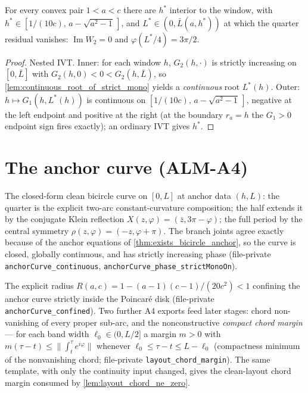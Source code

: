 \begin{theorem}
  \label{thm:exists_bicircle_anchor}
  For every convex pair $1<a<c$ there are $h^*$ interior to the window, with
  $h^*\in[1/(10c),\,a-\sqrt{a^2-1}\,]$, and $L^*\in(0,\bar L(a,h^*))$ at
  which the quarter residual vanishes:
  $\operatorname{Im}W_2=0$ and $\varphi(L^*/4)=3\pi/2$.
\end{theorem}

\begin{proof}
  \leanok
  Nested IVT.  Inner: for each window $h$, $G_2(h,\cdot)$ is strictly
  increasing on $[0,\bar L]$ with $G_2(h,0)<0<G_2(h,\bar L)$, so
  \cref{lem:continuous_root_of_strict_mono} yields a \emph{continuous} root
  $L^*(h)$.  Outer: $h\mapsto G_1(h,L^*(h))$ is continuous on
  $[1/(10c),\,a-\sqrt{a^2-1}\,]$, negative at the left endpoint and positive
  at the right (at the boundary $r_a=h$ the $G_1>0$ endpoint sign fires
  exactly); an ordinary IVT gives $h^*$.
\end{proof}

\section{The anchor curve (ALM-A4)}

\begin{definition}
  \label{def:anchor_curve}
  The closed-form clean bicircle curve on $[0,L]$ at anchor data $(h,L)$: the
  quarter is the explicit two-arc constant-curvature composition; the half
  extends it by the conjugate Klein reflection
  $X(z,\varphi)=(\bar z,3\pi-\varphi)$; the full period by the central
  symmetry $\rho(z,\varphi)=(-z,\varphi+\pi)$.  The branch joints agree
  exactly because of the anchor equations of
  \cref{thm:exists_bicircle_anchor}, so the curve is closed, globally
  continuous, and has strictly increasing phase (file-private
  \texttt{anchorCurve\_continuous}, \texttt{anchorCurve\_phase\_strictMonoOn}).
\end{definition}

\begin{definition}
  \label{def:anchor_confine_radius}
  The explicit radius $R(a,c)=1-(a-1)(c-1)/(20c^2)<1$ confining the anchor
  curve strictly inside the Poincaré disk (file-private
  \texttt{anchorCurve\_confined}).  Two further A4 exports feed later stages:
  chord non-vanishing of every proper sub-arc, and the nonconstructive
  \emph{compact chord margin} — for each band width $\ell_0\in(0,L/2]$ a
  margin $m>0$ with $m(\tau-t)\le\|\int_t^\tau e^{i\varphi}\|$ whenever
  $\ell_0\le\tau-t\le L-\ell_0$ (compactness minimum of the nonvanishing
  chord; file-private \texttt{layout\_chord\_margin}).  The same template,
  with only the continuity input changed, gives the clean-layout chord margin
  consumed by \cref{lem:layout_chord_ne_zero}.
\end{definition}

